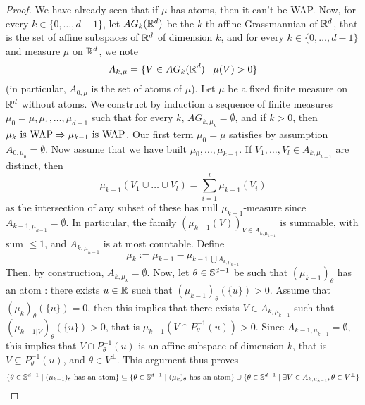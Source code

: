 \begin{proof}
    We have already seen that if $\mu$ has atoms, then it can't be WAP. \newline
    Now, for every $k \in \{0,\ldots,d-1\}$, let $AG_k(\mathbb R^d)$ be the $k$-th affine Grassmannian of $\mathbb R^d$, that is the set of affine subspaces of $\mathbb R^d$ of dimension $k$, and for every $k \in \{0,\ldots,d-1\}$ and measure $\mu$ on $\mathbb R^d$, we note
    \begin{equation}
        A_{k,\mu} = \{V \in AG_k(\mathbb R^d) \;|\; \mu(V) > 0 \}
    \end{equation}
    (in particular, $A_{0,\mu}$ is the set of atoms of $\mu$). Let $\mu$ be a fixed finite measure on $\mathbb R^d$ without atoms. We construct by induction a sequence of finite measures $\mu_0 = \mu, \mu_1, \ldots, \mu_{d-1}$ such that for every $k$, $AG_{k,\mu_k} = \emptyset$, and if $k > 0$, then $\mu_k \hbox{ is WAP} \Rightarrow \mu_{k-1} \hbox{ is WAP}$. Our first term $\mu_0 = \mu$ satisfies by assumption $A_{0,\mu_0} = \emptyset$. Now assume that we have built $\mu_0,\ldots,\mu_{k-1}$. \newline
    If $V_1,\ldots,V_l \in A_{k,\mu_{k-1}}$ are distinct, then
    \begin{equation} \mu_{k-1}(V_1 \cup \ldots \cup V_l) = \sum_{i=1}^l \mu_{k-1}(V_i) \end{equation}
    as the intersection of any subset of these has null $\mu_{k-1}$-measure since $A_{k-1,\mu_{k-1}} = \emptyset$. In particular, the family $(\mu_{k-1}(V))_{V \in A_{k,\mu_{k-1}}}$ is summable, with sum $\leq 1$, and $A_{k,\mu_{k-1}}$ is at most countable. Define
    \begin{equation} \mu_k := \mu_{k-1} - \mu_{k-1| \bigcup A_{k,\mu_{k-1}}} \end{equation}
    Then, by construction, $A_{k,\mu_k} = \emptyset$. Now, let $\theta \in \mathbb S^{d-1}$ be such that $(\mu_{k-1})_\theta$ has an atom : there exists $u \in \mathbb R$ such that $(\mu_{k-1})_\theta(\{u\}) > 0$. Assume that $(\mu_k)_\theta(\{u\}) = 0$, then this implies that there exists $V \in A_{k,\mu_{k-1}}$ such that $(\mu_{k-1|V})_\theta(\{u\}) > 0$, that is $\mu_{k-1}(V \cap P_\theta^{-1}(u)) > 0$. Since $A_{k-1,\mu_{k-1}} = \emptyset$, this implies that $V \cap P_\theta^{-1}(u)$ is an affine subspace of dimension $k$, that is $V \subseteq P_\theta^{-1}(u)$, and $\theta \in V^\perp$. This argument thus proves
    \begin{equation}
         \{\theta \in \bS^{d-1} \setcond (\mu_{k-1})_\theta \hbox{ has an atom} \} \subseteq \{\theta \in \bS^{d-1} \setcond (\mu_k)_\theta \hbox{ has an atom} \} \cup \{ \theta \in \bS^{d-1} \setcond \exists V \in A_{k,\mu_{k-1}}, \theta \in V^\perp \}

\end{equation}
\end{proof}
